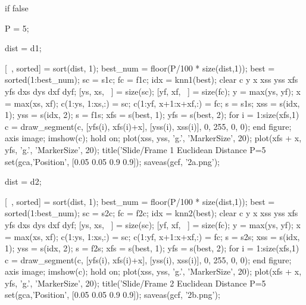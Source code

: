 if false

P = 5;

dist = d1;

[~, sorted] = sort(dist, 1);
best_num = floor(P/100 * size(dist,1));
best = sorted(1:best_num);
sc = s1c;
fc = f1c;
idx = knn1(best);
clear c y x xss yss xfs yfs dxs dys dxf dyf;
[ys, xs, ~] = size(sc);
[yf, xf, ~] = size(fc);
y = max(ys, yf);
x = max(xs, xf);
c(1:ys, 1:xs,:) = sc;
c(1:yf, x+1:x+xf,:) = fc;
s = s1s;
xss = s(idx, 1);
yss = s(idx, 2);
s = f1s;
xfs = s(best, 1);
yfs = s(best, 2);
for i = 1:size(xfs,1)
    c = draw_segment(c, [yfs(i), xfs(i)+x], [yss(i), xss(i)], 0, 255, 0, 0);
end
figure;
axis image;
imshow(c);
hold on;
plot(xss, yss, 'g.', 'MarkerSize', 20);
plot(xfs + x, yfs, 'g.', 'MarkerSize', 20);
title('Slide/Frame 1 Euclidean Distance P=5%
set(gca,'Position', [0.05 0.05 0.9 0.9]);
saveas(gcf, '2a.png');

dist = d2;

[~, sorted] = sort(dist, 1);
best_num = floor(P/100 * size(dist,1));
best = sorted(1:best_num);
sc = s2c;
fc = f2c;
idx = knn2(best);
clear c y x xss yss xfs yfs dxs dys dxf dyf;
[ys, xs, ~] = size(sc);
[yf, xf, ~] = size(fc);
y = max(ys, yf);
x = max(xs, xf);
c(1:ys, 1:xs,:) = sc;
c(1:yf, x+1:x+xf,:) = fc;
s = s2s;
xss = s(idx, 1);
yss = s(idx, 2);
s = f2s;
xfs = s(best, 1);
yfs = s(best, 2);
for i = 1:size(xfs,1)
    c = draw_segment(c, [yfs(i), xfs(i)+x], [yss(i), xss(i)], 0, 255, 0, 0);
end
figure;
axis image;
imshow(c);
hold on;
plot(xss, yss, 'g.', 'MarkerSize', 20);
plot(xfs + x, yfs, 'g.', 'MarkerSize', 20);
title('Slide/Frame 2 Euclidean Distance P=5%
set(gca,'Position', [0.05 0.05 0.9 0.9]);
saveas(gcf, '2b.png');

